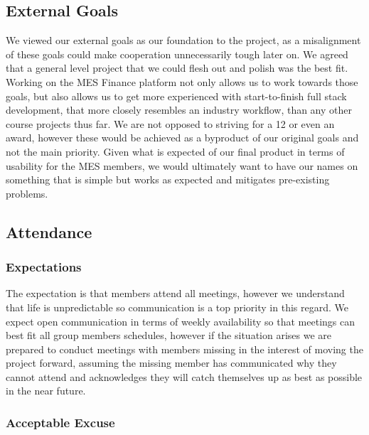 \documentclass{article}
\begin{document}
\subsection*{External Goals}

We viewed our external goals as our foundation to the project, as a misalignment of these goals could make cooperation unnecessarily tough later on. We agreed that a general level project that we could flesh out and polish was the best fit. Working on the MES Finance platform not only allows us to work towards those goals, but also allows us to get more experienced with start-to-finish full stack development, 
that more closely resembles an industry workflow, than any other course projects thus far. We are not opposed to striving for a 12 or even an award, however these would be achieved as a byproduct of our original goals and not the main priority. Given what is expected of our final product in terms of usability for the MES members, we would ultimately want to have our names on something that is simple but works as expected and mitigates pre-existing problems. 

\subsection*{Attendance}

\subsubsection*{Expectations}

The expectation is that members attend all meetings, however we understand that life is unpredictable so communication is a top priority in this regard. We expect open communication in terms of weekly availability so that meetings can best fit all group members schedules, however if the situation arises we are prepared to conduct meetings with members missing in the interest of moving the project forward, assuming the missing member has communicated why they cannot attend and acknowledges they will catch themselves up as best as possible in the near future.

\subsubsection*{Acceptable Excuse}
\end{document}
